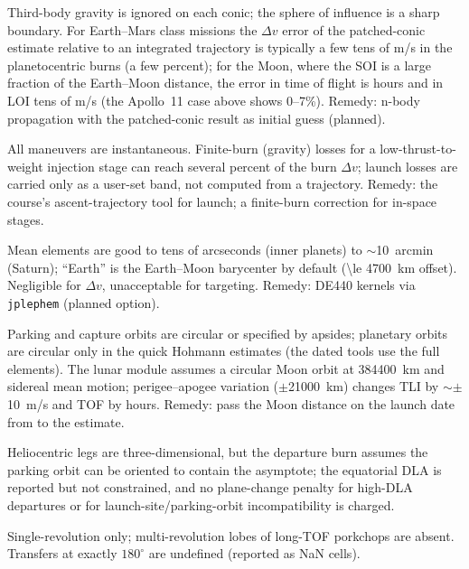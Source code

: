 \documentclass[11pt,a4paper]{article}
\newcommand{\dv}{\Delta v}
\newcommand{\code}[1]{\texttt{#1}}
\begin{document}
\begin{description}[style=nextline,leftmargin=0pt,itemsep=4pt]
\item[Patched conics.] Third-body gravity is ignored on each conic; the sphere of influence is
  a sharp boundary. For Earth--Mars class missions the $\dv$ error of the patched-conic
  estimate relative to an integrated trajectory is typically a few tens of m/s in the
  planetocentric burns (a few percent); for the Moon, where the SOI is a large fraction of the
  Earth--Moon distance, the error in time of flight is hours and in LOI tens of m/s (the
  Apollo~11 case above shows 0--7\%). Remedy: n-body propagation with the patched-conic result
  as initial guess (planned).
\item[Impulsive burns.] All maneuvers are instantaneous. Finite-burn (gravity) losses for a
  low-thrust-to-weight injection stage can reach several percent of the burn $\dv$; launch
  losses are carried only as a user-set band, not computed from a trajectory. Remedy: the
  course's ascent-trajectory tool for launch; a finite-burn correction for in-space stages.
\item[Ephemeris accuracy.] Mean elements are good to tens of arcseconds (inner planets) to
  $\sim$10~arcmin (Saturn); ``Earth'' is the Earth--Moon barycenter by default
  (\SI{\le 4700}{km} offset). Negligible for $\dv$, unacceptable for targeting. Remedy: DE440
  kernels via \code{jplephem} (planned option).
\item[Circular-orbit assumptions.] Parking and capture orbits are circular or specified by
  apsides; planetary orbits are circular only in the quick Hohmann estimates (the dated tools
  use the full elements). The lunar module assumes a circular Moon orbit at \SI{384400}{km}
  and sidereal mean motion; perigee--apogee variation ($\pm$\SI{21000}{km}) changes TLI by
  $\sim\pm$\SI{10}{m/s} and TOF by hours. Remedy: pass the Moon distance on the launch date
  from  to the estimate.
\item[Plane and declination constraints.] Heliocentric legs are three-dimensional, but the
  departure burn assumes the parking orbit can be oriented to contain the asymptote; the
  equatorial DLA is reported but not constrained, and no plane-change penalty for high-DLA
  departures or for launch-site/parking-orbit incompatibility is charged.
\item[Lambert.] Single-revolution only; multi-revolution lobes of long-TOF porkchops are
  absent. Transfers at exactly $180^\circ$ are undefined (reported as NaN cells).

\end{description}
\end{document}
